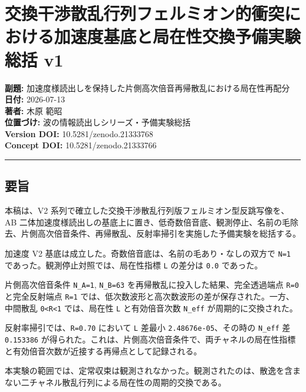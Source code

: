 \documentclass[
  xelatex,
  ja=standard]{bxjsarticle}
\author{}
\date{}
\begin{document}
\section{交換干渉散乱行列フェルミオン的衝突における加速度基底と局在性交換予備実験総括
v1}\label{ux4ea4ux63dbux5e72ux6e09ux6563ux4e71ux884cux5217ux30d5ux30a7ux30ebux30dfux30aaux30f3ux7684ux885dux7a81ux306bux304aux3051ux308bux52a0ux901fux5ea6ux57faux5e95ux3068ux5c40ux5728ux6027ux4ea4ux63dbux4e88ux5099ux5b9fux9a13ux7dcfux62ec-v1}

\textbf{副題:}
加速度様読出しを保持した片側高次倍音再帰散乱における局在性再配分\\
\textbf{日付:} 2026-07-13\\
\textbf{著者:} 木原 範昭\\
\textbf{位置づけ:} 波の情報読出しシリーズ・予備実験総括\\
\textbf{Version DOI:} 10.5281/zenodo.21333768\\
\textbf{Concept DOI:} 10.5281/zenodo.21333766

\begin{center}\rule{0.5\linewidth}{0.5pt}\end{center}

\subsection{要旨}\label{ux8981ux65e8}

本稿は、V2 系列で確立した交換干渉散乱行列版フェルミオン型反跳写像を、AB
二体加速度様読出しの基底上に置き、低奇数倍音底、観測停止、名前の毛除去、片側高次倍音条件、再帰散乱、反射率掃引を実施した予備実験を総括する。

加速度 V2 基底は成立した。奇数倍音底は、名前の毛あり・なしの双方で
\texttt{N=1} であった。観測停止対照では、局在性指標 \texttt{L} の差分は
\texttt{0.0} であった。

片側高次倍音条件 \texttt{N\_A=1}, \texttt{N\_B=63}
を再帰散乱に投入した結果、完全透過端点 \texttt{R=0} と完全反射端点
\texttt{R=1}
では、低次数波形と高次数波形の差が保存された。一方、中間散乱
\texttt{0\textless{}R\textless{}1} では、局在性 \texttt{L}
と有効倍音次数 \texttt{N\_eff} が周期的に交換された。

反射率掃引では、\texttt{R=0.70} において \texttt{L} 差最小
\texttt{2.48676e-05}、その時の \texttt{N\_eff} 差 \texttt{0.153386}
が得られた。これは、片側高次倍音条件で、両チャネルの局在性指標と有効倍音次数が近接する再帰点として記録される。

本実験の範囲では、定常収束は観測されなかった。観測されたのは、散逸を含まない二チャネル散乱行列による局在性の周期的交換である。
\end{document}
